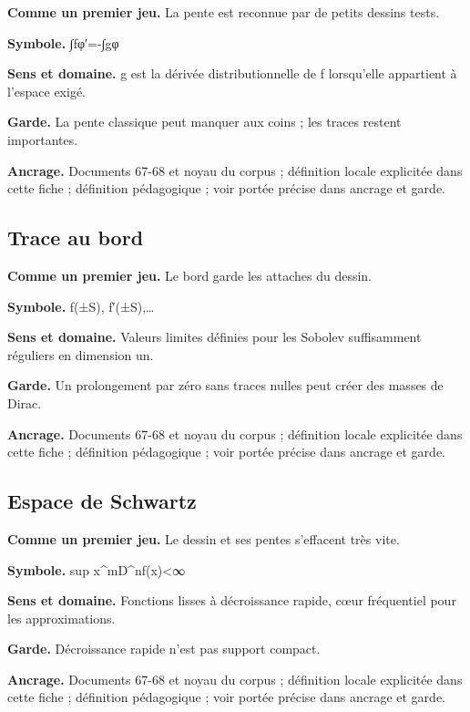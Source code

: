 \documentclass[
  9pt,
  a4paper,
]{article}
\begin{document}
\textbf{Comme un premier jeu.} La pente est reconnue par de petits
dessins tests.

\textbf{Symbole.} ∫fφ′=-∫gφ

\textbf{Sens et domaine.} g est la dérivée distributionnelle de f
lorsqu'elle appartient à l'espace exigé.

\textbf{Garde.} La pente classique peut manquer aux coins ; les traces
restent importantes.

\textbf{Ancrage.} Documents 67-68 et noyau du corpus ; définition locale
explicitée dans cette fiche ; définition pédagogique ; voir portée
précise dans ancrage et garde.

\hypertarget{trace-au-bord}{%
\subsection{Trace au bord}\label{trace-au-bord}}

\textbf{Comme un premier jeu.} Le bord garde les attaches du dessin.

\textbf{Symbole.} f(±S), f′(±S),\ldots{}

\textbf{Sens et domaine.} Valeurs limites définies pour les Sobolev
suffisamment réguliers en dimension un.

\textbf{Garde.} Un prolongement par zéro sans traces nulles peut créer
des masses de Dirac.

\textbf{Ancrage.} Documents 67-68 et noyau du corpus ; définition locale
explicitée dans cette fiche ; définition pédagogique ; voir portée
précise dans ancrage et garde.

\hypertarget{espace-de-schwartz}{%
\subsection{Espace de Schwartz}\label{espace-de-schwartz}}

\textbf{Comme un premier jeu.} Le dessin et ses pentes s'effacent très
vite.

\textbf{Symbole.} sup \textbar x\^{}mD\^{}nf(x)\textbar\textless∞

\textbf{Sens et domaine.} Fonctions lisses à décroissance rapide, cœur
fréquentiel pour les approximations.

\textbf{Garde.} Décroissance rapide n'est pas support compact.

\textbf{Ancrage.} Documents 67-68 et noyau du corpus ; définition locale
explicitée dans cette fiche ; définition pédagogique ; voir portée
précise dans ancrage et garde.
\end{document}
